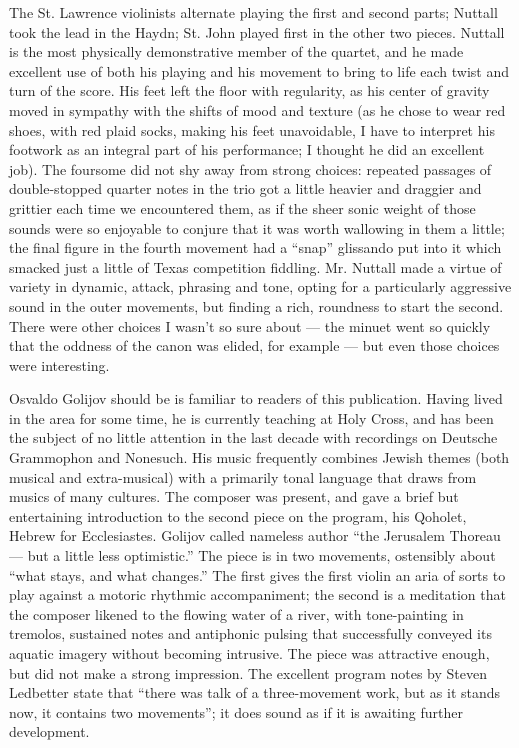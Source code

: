 The St. Lawrence violinists alternate playing the first and second parts; Nuttall took the lead in the Haydn; St. John played first in the other two pieces. Nuttall is the most physically demonstrative member of the quartet, and he made excellent use of both his playing and his movement to bring to life each twist and turn of the score. His feet left the floor with regularity, as his center of gravity moved in sympathy with the shifts of mood and texture (as he chose to wear red shoes, with red plaid socks, making his feet unavoidable, I have to interpret his footwork as an integral part of his performance; I thought he did an excellent job). The foursome did not shy away from strong choices: repeated passages of double-stopped quarter notes in the trio got a little heavier and draggier and grittier each time we encountered them, as if the sheer sonic weight of those sounds were so enjoyable to conjure that it was worth wallowing in them a little; the final figure in the fourth movement had a “snap” glissando put into it which smacked just a little of Texas competition fiddling. Mr. Nuttall made a virtue of variety in dynamic, attack, phrasing and tone, opting for a particularly aggressive sound in the outer movements, but finding a rich, roundness to start the second. There were other choices I wasn’t so sure about — the minuet went so quickly that the oddness of the canon was elided, for example — but even those choices were interesting.

Osvaldo Golijov should be is familiar to readers of this publication. Having lived in the area for some time, he is currently teaching at Holy Cross, and has been the subject of no little attention in the last decade with recordings on Deutsche Grammophon and Nonesuch. His music frequently combines Jewish themes (both musical and extra-musical) with a primarily tonal language that draws from musics of many cultures. The composer was present, and gave a brief but entertaining introduction to the second piece on the program, his Qoholet, Hebrew for Ecclesiastes. Golijov called nameless author “the Jerusalem Thoreau — but a little less optimistic.” The piece is in two movements, ostensibly about “what stays, and what changes.” The first gives the first violin an aria of sorts to play against a motoric rhythmic accompaniment; the second is a meditation that the composer likened to the flowing water of a river, with tone-painting in tremolos, sustained notes and antiphonic pulsing that successfully conveyed its aquatic imagery without becoming intrusive. The piece was attractive enough, but did not make a strong impression. The excellent program notes by Steven Ledbetter state that “there was talk of a three-movement work, but as it stands now, it contains two movements”; it does sound as if it is awaiting further development.


